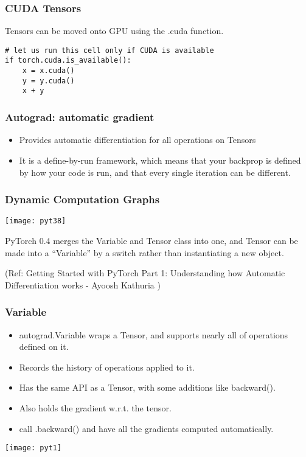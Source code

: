 \begin{frame}[fragile] \frametitle{CUDA Tensors}
Tensors can be moved onto GPU using the .cuda function.

\begin{lstlisting}
# let us run this cell only if CUDA is available
if torch.cuda.is_available():
    x = x.cuda()
    y = y.cuda()
    x + y

\end{lstlisting}
\end{frame}

\begin{frame}[fragile] \frametitle{Autograd: automatic gradient}
\begin{itemize}
\item Provides automatic differentiation for all operations on Tensors
\item It is a define-by-run framework, which means that your backprop is defined by how your code is run, and that every single iteration can be different.
\end{itemize}
\end{frame}

\begin{frame}[fragile] \frametitle{Dynamic Computation Graphs}

\begin{center}
\texttt{[image: pyt38]}
\end{center}
PyTorch 0.4 merges the Variable and Tensor class into one, and Tensor can be made into a “Variable” by a switch rather than instantiating a new object. 

{\tiny (Ref: Getting Started with PyTorch Part 1: Understanding how Automatic Differentiation works - Ayoosh Kathuria )}
\end{frame}


\begin{frame}[fragile] \frametitle{Variable}
\begin{itemize}
\item autograd.Variable wraps a Tensor, and supports nearly all of operations defined on it.
\item Records the history of operations applied to it. 
\item Has the same API as a Tensor, with some additions like backward(). 
\item Also holds the gradient w.r.t. the tensor.
\item call .backward() and have all the gradients computed automatically.
\end{itemize}
\begin{center}
\texttt{[image: pyt1]}
\end{center}
\end{frame}


